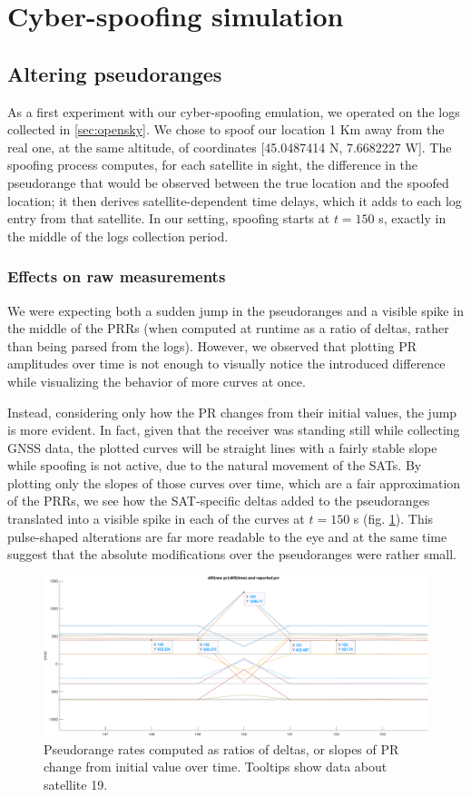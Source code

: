 \section{Cyber-spoofing simulation}
\label{sec:spoofing}
\subsection{Altering pseudoranges}
\label{subsec:altering_pseudoranges}
As a first experiment with our cyber-spoofing emulation, we operated on the logs collected in \ref{sec:opensky}. We chose to spoof our location 1 Km away from the real one, at the same altitude, of coordinates [45.0487414 N, 7.6682227 W]. The spoofing process computes, for each satellite in sight, the difference in the pseudorange that would be observed between the true location and the spoofed location; it then derives satellite-dependent time delays, which it adds to each log entry from that satellite.
In our setting, spoofing starts at $t = 150$ s, exactly in the middle of the logs collection period. 
\subsubsection{Effects on raw measurements}
\label{subsec:effects_raw_meas}
We were expecting both a sudden jump in the pseudoranges and a visible spike in the middle of the PRRs (when computed at runtime as a ratio of deltas, rather than being parsed from the logs). However, we observed that plotting PR amplitudes over time is not enough to visually notice the introduced difference while visualizing the behavior of more curves at once. 

Instead, considering only how the PR changes from their initial values, the jump is more evident. In fact, given that the receiver was standing still while collecting GNSS data, the plotted curves will be straight lines with a fairly stable slope while spoofing is not active, due to the natural movement of the SATs. By plotting only the slopes of those curves over time, which are a fair approximation of the PRRs, we see how the SAT-specific deltas added to the pseudoranges translated into a visible spike in each of the curves at $t = 150$ s (fig. \ref{fig:spoofing_no_delay_prrs}). This pulse-shaped alterations are far more readable to the eye and at the same time suggest that the absolute modifications over the pseudoranges were rather small. 

\begin{figure}[H]
    \centering
    \includegraphics[width=0.75
    \linewidth]{images/1KM_spoofing_prr_of_sat_19}
    \caption{Pseudorange rates computed as ratios of deltas, or slopes of PR change from initial value over time. Tooltips show data about satellite 19.}
    \label{fig:spoofing_no_delay_prrs}
\end{figure}

